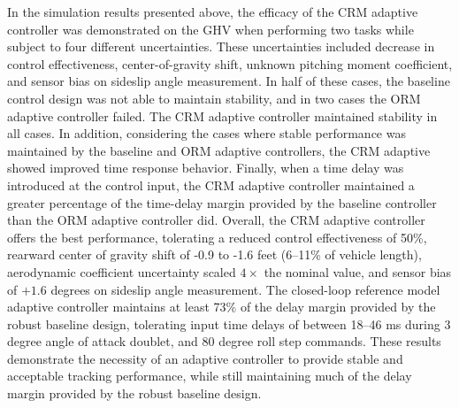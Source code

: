In the simulation results presented above, the efficacy of the CRM adaptive controller was demonstrated on the GHV when performing two tasks while subject to four different uncertainties.
These uncertainties included decrease in control effectiveness, center-of-gravity shift, unknown pitching moment coefficient, and sensor bias on sideslip angle measurement.
In half of these cases, the baseline control design was not able to maintain stability, and in two cases the ORM adaptive controller failed.
The CRM adaptive controller maintained stability in all cases.
In addition, considering the cases where stable performance was maintained by the baseline and ORM adaptive controllers, the CRM adaptive showed improved time response behavior.
Finally, when a time delay was introduced at the control input, the CRM adaptive controller maintained a greater percentage of the time-delay margin provided by the baseline controller than the ORM adaptive controller did.
Overall, the CRM adaptive controller offers the best performance, tolerating a reduced control effectiveness of 50\%, rearward center of gravity shift of -0.9 to -1.6 feet (6--11\% of vehicle length), aerodynamic coefficient uncertainty scaled $4\times$ the nominal value, and sensor bias of $+1.6$ degrees on sideslip angle measurement.
The closed-loop reference model adaptive controller maintains at least 73\% of the delay margin provided by the robust baseline design, tolerating input time delays of between 18--46 ms during 3 degree angle of attack doublet, and 80 degree roll step commands.
These results demonstrate the necessity of an adaptive controller to provide stable and acceptable tracking performance, while still maintaining much of the delay margin provided by the robust baseline design.

